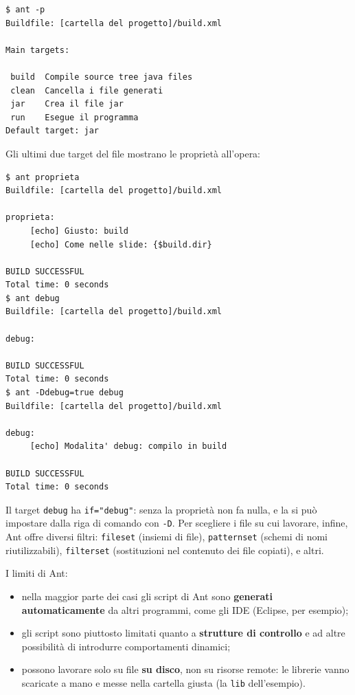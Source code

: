\begin{lstlisting}[style=shell, name=Terminale]
$ ant -p
Buildfile: [cartella del progetto]/build.xml

Main targets:

 build  Compile source tree java files
 clean  Cancella i file generati
 jar    Crea il file jar
 run    Esegue il programma
Default target: jar
\end{lstlisting}

Gli ultimi due target del file mostrano le proprietà all'opera:

\begin{lstlisting}[style=shell, name=Terminale]
$ ant proprieta
Buildfile: [cartella del progetto]/build.xml

proprieta:
     [echo] Giusto: build
     [echo] Come nelle slide: {$build.dir}

BUILD SUCCESSFUL
Total time: 0 seconds
$ ant debug
Buildfile: [cartella del progetto]/build.xml

debug:

BUILD SUCCESSFUL
Total time: 0 seconds
$ ant -Ddebug=true debug
Buildfile: [cartella del progetto]/build.xml

debug:
     [echo] Modalita' debug: compilo in build

BUILD SUCCESSFUL
Total time: 0 seconds
\end{lstlisting}


Il target \texttt{debug} ha \texttt{if="debug"}: senza la proprietà non fa nulla, e la si può impostare dalla riga di
comando con \texttt{-D}. Per scegliere i file su cui lavorare, infine, Ant offre diversi filtri: \texttt{fileset}
(insiemi di file), \texttt{patternset} (schemi di nomi riutilizzabili), \texttt{filterset} (sostituzioni nel contenuto
dei file copiati), e altri.

I limiti di Ant:

\begin{itemize}
  \item nella maggior parte dei casi gli script di Ant sono \textbf{generati automaticamente} da altri programmi, come
        gli IDE (Eclipse, per esempio);
  \item gli script sono piuttosto limitati quanto a \textbf{strutture di controllo} e ad altre possibilità di introdurre
        comportamenti dinamici;
  \item possono lavorare solo su file \textbf{su disco}, non su risorse remote: le librerie vanno scaricate a mano e
        messe nella cartella giusta (la \texttt{lib} dell'esempio).
\end{itemize}

